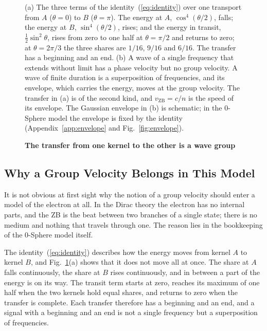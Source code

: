 \documentclass[%
 reprint, amsmath,amssymb, aps, prb, ]{revtex4-2}
\numberwithin{equation}{section}
\begin{document}
\begin{figure}[t!]
\caption{\textbf{The transfer from one kernel to the other is a wave group}}
\label{fig:group}
\vspace{0.4em}
\begin{minipage}{0.95\textwidth}
\justifying\small
(a) The three terms of the identity~(\ref{eq:identity}) over one transport from $A$ ($\theta = 0$) to $B$ ($\theta = \pi$). The energy at $A$, $\cos^4(\theta/2)$, falls; the energy at $B$, $\sin^4(\theta/2)$, rises; and the energy in transit, $\tfrac12\sin^2\theta$, rises from zero to one half at $\theta = \pi/2$ and returns to zero; at $\theta = 2\pi/3$ the three shares are $1/16$, $9/16$ and $6/16$. The transfer has a beginning and an end. (b) A wave of a single frequency that extends without limit has a phase velocity but no group velocity. A wave of finite duration is a superposition of frequencies, and its envelope, which carries the energy, moves at the group velocity. The transfer in (a) is of the second kind, and $v_{\text{ZB}} = c/n$ is the speed of its envelope. The Gaussian envelope in (b) is schematic; in the 0-Sphere model the envelope is fixed by the identity (Appendix~\ref{app:envelope} and Fig.~\ref{fig:envelope}).
\end{minipage}
\end{figure}

\subsection{Why a Group Velocity Belongs in This Model}
\label{app:why_belongs}

It is not obvious at first sight why the notion of a group velocity should enter a model of the electron at all. In the Dirac theory the electron has no internal parts, and the ZB is the beat between two branches of a single state; there is no medium and nothing that travels through one. The reason lies in the bookkeeping of the 0-Sphere model itself.

The identity~(\ref{eq:identity}) describes how the energy moves from kernel $A$ to kernel $B$, and Fig.~\ref{fig:group}(a) shows that it does not move all at once. The share at $A$ falls continuously, the share at $B$ rises continuously, and in between a part of the energy is on its way. The transit term starts at zero, reaches its maximum of one half when the two kernels hold equal shares, and returns to zero when the transfer is complete. Each transfer therefore has a beginning and an end, and a signal with a beginning and an end is not a single frequency but a superposition of frequencies.
\end{document}
